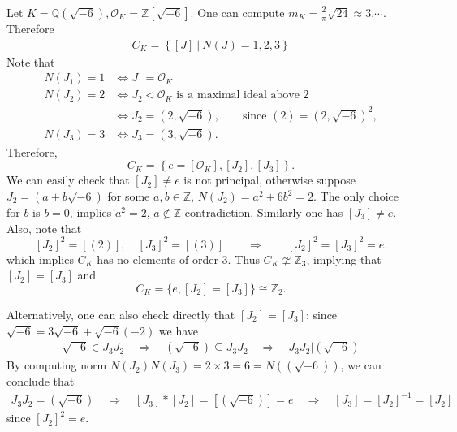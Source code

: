 \begin{example}
    Let \(K = \mathbb{Q}(\sqrt{-6}), \mathcal{O}_K = \mathbb{Z}[\sqrt{-6}] \). One can compute \(m_K = \frac{2}{\pi}\sqrt{24} \approx 3.\cdots\). Therefore
    \begin{align*}
        C_K = \left\{[J]\ |\  N(J)= 1,2,3\right\}
    \end{align*}
    Note that
    \begin{align*}
        N(J_1) = 1 &\Leftrightarrow J_1 = \mathcal{O}_K\\
        N(J_2) = 2 &\Leftrightarrow J_2 \triangleleft \mathcal{O}_K \text{ is a maximal ideal above }2\\
        &\Leftrightarrow J_2=(2,\sqrt{-6}), \qquad \text{since }(2)=(2,\sqrt{-6})^2,\\
        N(J_3) = 3 &\Leftrightarrow J_3 = (3,\sqrt{-6}).
    \end{align*}
    Therefore, \[C_K = \left\{e=[\mathcal{O}_K], [J_2], [J_3]\right\}.\] 
    We can easily check that \([J_2] \neq e\) is not principal, otherwise suppose \(J_2 = (a+b\sqrt{-6})\) for some \(a,b \in \mathbb{Z}\), \(N(J_2)= a^2+6b^2 = 2\). The only choice for \(b\) is \(b = 0\), implies  \(a^2 =2\), \(a \notin \mathbb{Z}\) contradiction. Similarly one has \([J_3] \neq e\). Also, note that 
    \[[J_2]^2 = [(2)], \quad [J_3]^2 = [(3)]  \quad \quad \Rightarrow \quad \quad [J_2]^2 = [J_3]^2 = e.\]
    which implies \(C_K\) has no elements of order 3. Thus \(C_K \ncong \mathbb{Z}_3\), implying that $[J_2] = [J_3]$ and 
    \[C_K = \{e, [J_2] = [J_3]\} \cong \mathbb{Z}_2.\]

    Alternatively, one can also check directly that $[J_2] = [J_3]$: since \(\sqrt{-6} = 3\sqrt{-6} + \sqrt{-6}(-2)\) we have
    \begin{align*}
        \sqrt{-6} \in J_3 J_2 \quad \Rightarrow \quad (\sqrt{-6}) \subseteq J_3 J_2\quad \Rightarrow \quad J_3 J_2 | (\sqrt{-6})
    \end{align*}
    By computing norm \(N(J_2) N(J_3) = 2 \times 3 = 6 = N\left((\sqrt{-6})\right)\), we can conclude that 
    \begin{align*}
        J_3J_2 = (\sqrt{-6}) \quad \Rightarrow \quad [J_3]*[J_2] = [(\sqrt{-6})] = e \quad \Rightarrow \quad [J_3] = [J_2]^{-1} = [J_2]
    \end{align*}
    since $[J_2]^2 = e$.
\end{example}

